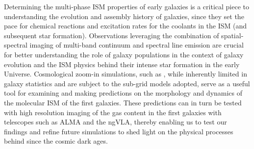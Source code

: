 \IfFileExists{emulateapjlegacy.cls}{\documentclass[iop]{emulateapjlegacy}}{\documentclass[iop]{emulateapj}}
\begin{document}
Determining the multi-phase ISM properties of early galaxies
is a critical piece to understanding the evolution and
assembly history of galaxies, since they set the pace
for chemical reactions and excitation rates for the coolants in the ISM (and subsequent star formation).
Observations leveraging the combination of spatial-spectral imaging of
multi-band continuum and spectral line emission are crucial for better understanding
the role of \highz galaxy populations
in the context of galaxy evolution and the ISM physics behind their intense star formation in the early Universe.
Cosmological zoom-in simulations, such as , while inherently limited in galaxy
statistics and are subject to the sub-grid models adopted,
serve as a useful tool for examining and making predictions on the
morphology and dynamics of 
the molecular ISM of the first galaxies.
These predictions can in turn be
tested with high resolution imaging of the gas content in the first galaxies with telescopes such as ALMA and the ngVLA, thereby
enabling us to test our findings and refine future simulations to shed light on the physical processes behind
\SF since the cosmic dark ages.


\acknowledgements
\end{document}
